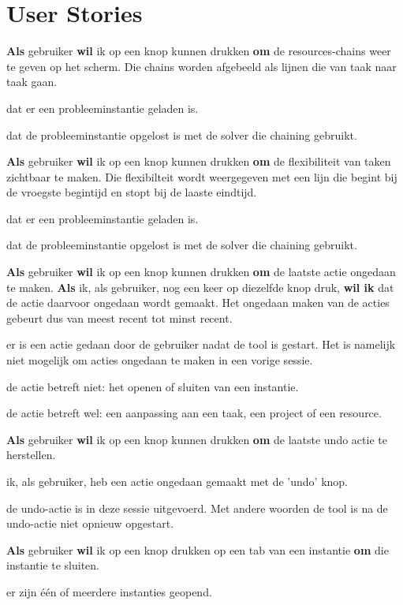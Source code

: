 \section{User Stories}
\setcounter{userstory}{0}
\nextUserStory
\textbf{Als} gebruiker \textbf{wil} ik op een knop kunnen drukken \textbf{om} de resources-chains weer te geven op het scherm. Die chains worden afgebeeld als lijnen die van taak naar taak gaan. 
\beginGegeven
    \item dat er een probleeminstantie geladen is.
    \item dat de probleeminstantie opgelost is met de solver die chaining gebruikt. 
\endGegeven

\nextUserStory
\textbf{Als} gebruiker \textbf{wil} ik op een knop kunnen drukken \textbf{om} de flexibiliteit van taken zichtbaar te maken. Die flexibilteit wordt weergegeven met een lijn die begint bij de vroegste begintijd en stopt bij de laaste eindtijd.
\beginGegeven
    \item dat er een probleeminstantie geladen is.
    \item dat de probleeminstantie opgelost is met de solver die chaining gebruikt. 
\endGegeven

\nextUserStory
\textbf{Als} gebruiker \textbf{wil} ik op een knop kunnen drukken \textbf{om} de laatste actie ongedaan te maken. \textbf{Als} ik, als gebruiker, nog een keer op diezelfde knop druk, \textbf{wil ik} dat de actie daarvoor ongedaan wordt gemaakt. Het ongedaan maken van de acties gebeurt dus van meest recent tot minst recent. 
\beginGegeven
    \item er is een actie gedaan door de gebruiker nadat de tool is gestart. Het is namelijk niet mogelijk om acties ongedaan te maken in een vorige sessie. 
    \item de actie betreft niet: het openen of sluiten van een instantie.
    \item de actie betreft wel: een aanpassing aan een taak, een project of een resource. 
\endGegeven

\nextUserStory
\textbf{Als} gebruiker \textbf{wil} ik op een knop kunnen drukken \textbf{om} de laatste undo actie te herstellen.
\beginGegeven
    \item ik, als gebruiker, heb een actie ongedaan gemaakt met de 'undo' knop. 
    \item de undo-actie is in deze sessie uitgevoerd. Met andere woorden de tool is na de undo-actie niet opnieuw opgestart. 
\endGegeven

\nextUserStory
\textbf{Als} gebruiker \textbf{wil} ik op een knop drukken op een tab van een instantie \textbf{om} die instantie te sluiten. 
\beginGegeven
    \item er zijn \'e\'en of meerdere instanties geopend.
\endGegeven

